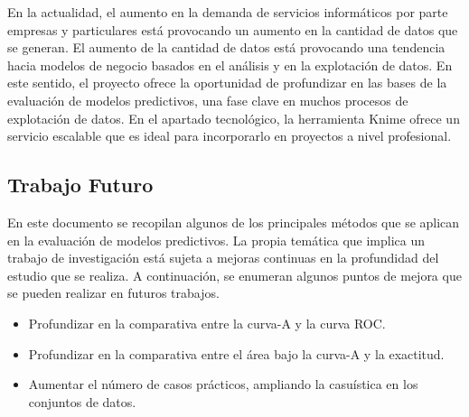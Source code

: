 \bigbreak

En la actualidad, el aumento en la demanda de servicios informáticos por parte empresas y particulares está provocando un aumento en la cantidad de datos que se generan. El aumento de la cantidad de datos está provocando una tendencia hacia modelos de negocio basados en el análisis y en la explotación de datos. En este sentido, el proyecto ofrece la oportunidad de profundizar en las bases de la evaluación de modelos predictivos, una fase clave en muchos procesos de explotación de datos. En el apartado tecnológico, la herramienta Knime ofrece un servicio escalable que es ideal para incorporarlo en proyectos a nivel profesional.

\subsection{Trabajo Futuro}

En este documento se recopilan algunos de los principales métodos que se aplican en la evaluación de modelos predictivos. La propia temática que implica un trabajo de investigación está sujeta a mejoras continuas en la profundidad del estudio que se realiza. A continuación, se enumeran algunos puntos de mejora que se pueden realizar en futuros trabajos.

\begin{itemize}
    \item Profundizar en la comparativa entre la curva-A y la curva ROC.
    \item Profundizar en la comparativa entre el área bajo la curva-A y la exactitud.
    \item Aumentar el número de casos prácticos, ampliando la casuística en los conjuntos de datos.
\end{itemize}

\clearpage